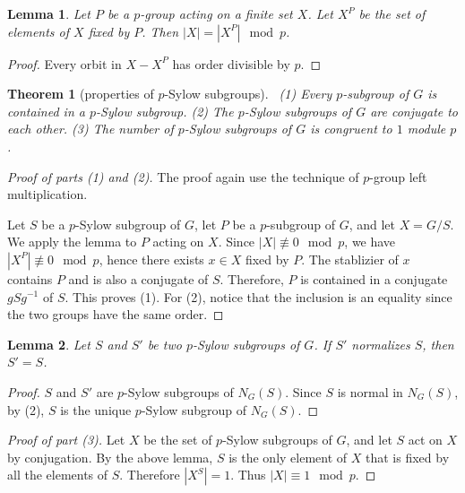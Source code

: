 \documentclass{article}
\newtheorem{Thm}{Theorem}[section]
\newtheorem{Lem}{Lemma}[section]
\theoremstyle{definition}
\begin{document}
\begin{Lem}
    Let $P$ be a $p$-group acting on a finite set $X$. Let $X^P$ be the set of elements of $X$ fixed by $P$. Then $\left|X\right|=\left|X^P\right|\mod{p}$.
\end{Lem}
\begin{proof}
    Every orbit in $X-X^P$ has order divisible by $p$.
\end{proof}

\begin{Thm}[properties of $p$-Sylow subgroups]
\,\newline
(1) Every $p$-subgroup of $G$ is contained in a $p$-Sylow subgroup.\newline
(2) The $p$-Sylow subgroups of $G$ are conjugate to each other.\newline
(3) The number of $p$-Sylow subgroups of $G$ is congruent to $1$ module $p$.
\end{Thm}
\begin{proof}[Proof of parts (1) and (2)]
    The proof again use the technique of $p$-group left multiplication.\par  
    Let $S$ be a $p$-Sylow subgroup of $G$, let $P$ be a $p$-subgroup of $G$, and let $X=G/S$. We apply the lemma to $P$ acting on $X$.
Since $\left|X\right|\not\equiv 0\mod{p}$, we have $\left|X^P\right|\not\equiv 0\mod{p}$, hence there exists $x\in X$ fixed by $P$. The stablizier of $x$ contains $P$ and is also a conjugate of $S$.
Therefore, $P$ is contained in a conjugate $gSg^{-1}$ of $S$. This proves (1). For (2), notice that the inclusion is an equality since the two groups have the same order.
\end{proof}

\begin{Lem}
    Let $S$ and $S'$ be two $p$-Sylow subgroups of $G$. If $S'$ normalizes $S$, then $S'=S$.
\end{Lem}
\begin{proof}
    $S$ and $S'$ are $p$-Sylow subgroups of $N_G(S)$. Since $S$ is normal in $N_G(S)$, by (2), $S$ is the unique $p$-Sylow subgroup of $N_G(S)$.
\end{proof}
\begin{proof}[Proof of part (3)]
    Let $X$ be the set of $p$-Sylow subgroups of $G$, and let $S$ act on $X$ by conjugation. By the above lemma, $S$ is the only element of $X$ that is fixed by all the elements of $S$.
Therefore $\left|X^S\right|=1$. Thus $\left|X\right|\equiv 1\mod{p}$.
\end{proof}
\end{document}
